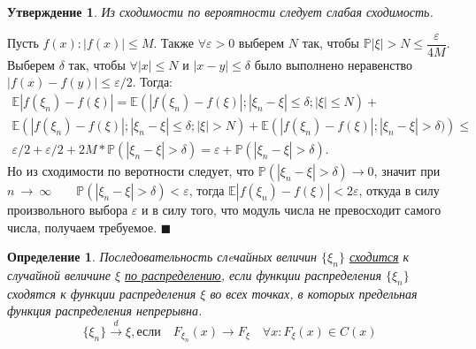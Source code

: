 \documentclass[12pt]{article}
\newtheorem{Def}{Определение}
\newtheorem{St}{Утверждение}
\newenvironment{Proof}{\par\noindent{\bf Доказательство}}{$\blacksquare$}
\numberwithin{Th}{section}
\numberwithin{Def}{section}
\numberwithin{Lem}{section}
\numberwithin{St}{section}
\numberwithin{equation}{section}
\newcommand\Pro{\mathbb{P}} %
\newcommand\Expec{\mathbb{E}} %
\begin{document}
\begin{St}
Из сходимости по вероятности следует слабая сходимость.
\end{St}

\begin{Proof}
Пусть $f(x) \colon |f(x)| \leqslant M.$ Также $\forall \varepsilon > 0$ выберем $N$ так, чтобы $\Pro{|\xi| > N} \leqslant \dfrac{\varepsilon}{4M}.$ Выберем $\delta$ так, чтобы $\forall |x| \leqslant N$ и $|x - y| \leqslant \delta$ было выполнено неравенство $|f(x) - f(y)| \leqslant \varepsilon/2$. Тогда:
\begin{multline*}
	\Expec{|f(\xi_n) - f(\xi)|} =
	\Expec{\left(|f(\xi_n) - f(\xi)|; |\xi_n - \xi| \leqslant \delta; |\xi| \leqslant N\right)} + \\
	\Expec{ \left( |f(\xi_n) - f(\xi)|; |\xi_n - \xi| \leqslant \delta; |\xi| > N \right) } +
	\Expec{ \left( |f(\xi_n) - f(\xi)|; |\xi_n - \xi| > \delta) \right) } \leqslant \\
	\varepsilon/2 + \varepsilon/2 + 2M * \Pro(|\xi_n - \xi| > \delta) = \varepsilon + \Pro(|\xi_n - \xi| > \delta).
\end{multline*}
Но из сходимости по веротности следует, что $\Pro(|\xi_n - \xi| > \delta) \rightarrow 0$, значит при $n~\rightarrow~\infty \qquad \Pro(|\xi_n - \xi| > \delta) < \varepsilon$, тогда $\Expec{|f(\xi_n) - f(\xi)|} < 2\varepsilon$, откуда в силу произвольного выбора $\varepsilon$ и в силу того, что модуль числа не превосходит самого числа, получаем требуемое.
\end{Proof}


\begin{Def}
Последовательность слeчайных величин $\{\xi_n\}$ \uline{сходится} к случайной величине $\xi$ \uline{по распределению}, если функции распределения $\{\xi_n\}$ сходятся к функции распределения $\xi$ во всех точках, в которых предельная функция распределения непрерывна.
$$\{ \xi_n \} \xrightarrow{d} \xi, \text{если} \quad F_{\xi_n}(x) \rightarrow F_\xi \quad \forall x \colon F_\xi(x) \in C(x)$$
\end{Def}
\end{document}
